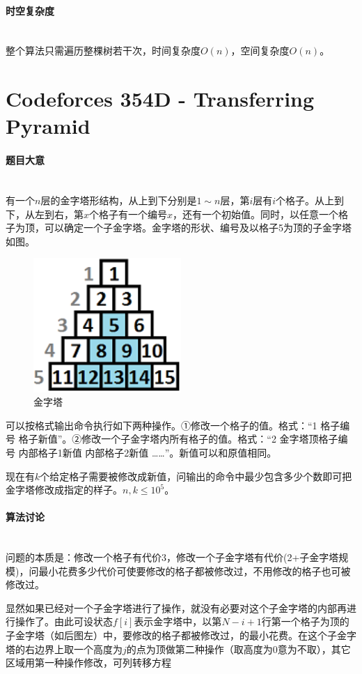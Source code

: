 \documentclass[UTF8]{ctexart}
\newcommand{\myparagraph}[1]{\paragraph{#1}\mbox{}\\}
\theoremstyle{nonumberplain}
\begin{document}
		\myparagraph{时空复杂度}
		
			整个算法只需遍历整棵树若干次，时间复杂度$O(n)$，空间复杂度$O(n)$。
	
	\section{Codeforces 354D - Transferring Pyramid}
	
		\myparagraph{题目大意}
		
			有一个$n$层的金字塔形结构，从上到下分别是$1 \sim n$层，第$i$层有$i$个格子。从上到下，从左到右，第$x$个格子有一个编号$x$，还有一个初始值。同时，以任意一个格子为顶，可以确定一个子金字塔。金字塔的形状、编号及以格子5为顶的子金字塔如图。
			
			\begin{figure}[ht]
				\centering
				\includegraphics[width=0.5\textwidth]{fig354d_1.png}
				\caption{金字塔}
			\end{figure}
			
			可以按格式输出命令执行如下两种操作。①修改一个格子的值。格式：“1 格子编号 格子新值”。②修改一个子金字塔内所有格子的值。格式：“2 金字塔顶格子编号 内部格子1新值 内部格子2新值 ……”。新值可以和原值相同。
			
			现在有$k$个给定格子需要被修改成新值，问输出的命令中最少包含多少个数即可把金字塔修改成指定的样子。$n,k \leq 10^5$。
		
		\myparagraph{算法讨论}
		
			问题的本质是：修改一个格子有代价3，修改一个子金字塔有代价(2+子金字塔规模)，问最小花费多少代价可使要修改的格子都被修改过，不用修改的格子也可被修改过。
			
			显然如果已经对一个子金字塔进行了操作，就没有必要对这个子金字塔的内部再进行操作了。由此可设状态$f[i]$表示金字塔中，以第$N-i+1$行第一个格子为顶的子金字塔（如后图左）中，要修改的格子都被修改过，的最小花费。在这个子金字塔的右边界上取一个高度为$j$的点为顶做第二种操作（取高度为0意为不取），其它区域用第一种操作修改，可列转移方程
			
\end{document}
